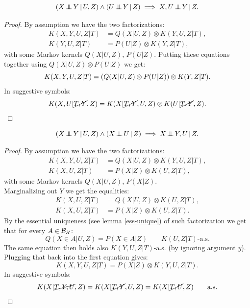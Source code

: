 \begin{Lem} 
    \[ (X \operatorname*{\perp\mkern-11mu\perp}  Y \operatorname*{|} U , Z) \land (U \operatorname*{\perp\mkern-11mu\perp}  Y \operatorname*{|} Z) \implies X , U \operatorname*{\perp\mkern-11mu\perp}  Y \operatorname*{|} Z.\]
\begin{proof}
    By assumption we have the two factorizations:
    \begin{align*}
        K(X,Y,U,Z|T) & = Q(X|U,Z) \otimes K(Y,U,Z|T),\\
        K(Y,U,Z|T) & = P(U|Z) \otimes K(Y,Z|T),
    \end{align*}
    with some Markov kernels $Q(X|U,Z)$, $P(U|Z)$. Putting these equations together using $Q(X|U,Z) \otimes P(U|Z)$ we get:
    \[ K(X,Y,U,Z|T) = \left ( Q(X|U,Z) \otimes P(U|Z)\right ) \otimes K(Y,Z|T).\]
    In suggestive symbols:
    \[K(X,U|\cancel{T,Y},Z) = K(X|\cancel{T,Y},U,Z) \otimes K(U|\cancel{T,Y},Z).\]
\end{proof}
\end{Lem}

\begin{Lem}
    \[ (X \operatorname*{\perp\mkern-11mu\perp}  Y \operatorname*{|} U , Z) \land (X \operatorname*{\perp\mkern-11mu\perp}  U \operatorname*{|} Z)  \implies X \operatorname*{\perp\mkern-11mu\perp}  Y , U \operatorname*{|} Z.\]
\begin{proof}
 By assumption we have the two factorizations:
    \begin{align*}
        K(X,Y,U,Z|T) & = Q(X|U,Z) \otimes K(Y,U,Z|T),\\
        K(X,U,Z|T) & = P(X|Z) \otimes K(U,Z|T),
    \end{align*}
    with some Markov kernels $Q(X|U,Z)$, $P(X|Z)$.\\
    Marginalizing out $Y$ we get the equalities:
    \begin{align*}
        K(X,U,Z|T) & = Q(X|U,Z) \otimes K(U,Z|T),\\
        K(X,U,Z|T) & = P(X|Z) \otimes K(U,Z|T).
    \end{align*}
    By the essential uniqueness (see lemma \ref{ess-unique}) of such factorization we get that for every $A \in \mathcal{B}_{\mathcal{X}}$:
\[ Q(X \in A|U,Z) = P(X \in A|Z) \qquad K(U,Z|T)\text{-a.s.}\]
The same equation then holds also $K(Y,U,Z|T)$-a.s. (by ignoring argument $y$).
Plugging that back into the first equation gives:
\[ K(X,Y,U,Z|T) = P(X|Z) \otimes K(Y,U,Z|T).\]
In suggestive symbols:
\[ K(X|\cancel{T,Y,U},Z) = K(X|\cancel{T,Y},U,Z) =  K(X|\cancel{T,U},Z) \qquad \text{a.s.}\]
\end{proof}
\end{Lem}

